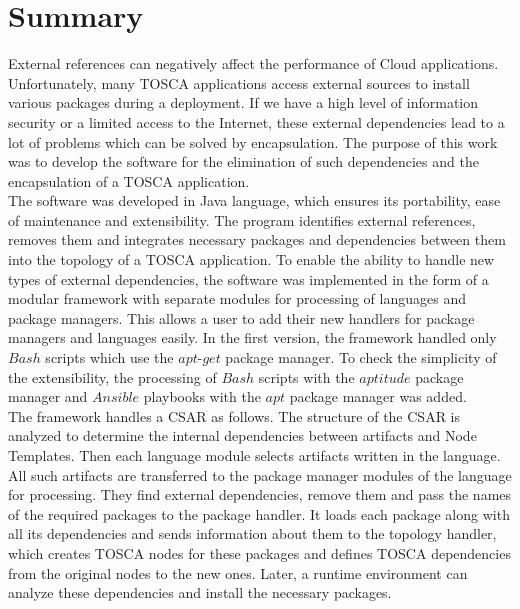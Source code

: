 
\chapter{Summary}\label{chap:zusfas}
External references can negatively affect the performance of Cloud applications.
Unfortunately, many TOSCA applications access external sources to install various packages during a deployment.
If we have a high level of information security or a limited access to the Internet, these external dependencies lead to a lot of problems which can be solved by encapsulation.
The purpose of this work was to develop the software for the elimination of such dependencies and the encapsulation of a TOSCA application.\\
The software was developed in Java language, which ensures its portability, ease of maintenance and extensibility.
The program identifies external references, removes them and integrates necessary packages and dependencies between them into the topology of a TOSCA application.
To enable the ability to handle new types of external dependencies, the software was implemented in the form of a modular framework with separate modules for processing of languages and package managers.
This allows a user to add their new handlers for package managers and languages easily.
In the first version, the framework handled only $Bash$ scripts  which use the $apt$-$get$ package manager.
To check the simplicity of the extensibility, the processing of $Bash$ scripts with the $aptitude$ package manager and  $Ansible$ playbooks with the $apt$ package manager was added.\\
The framework handles a CSAR as follows.
The structure of the CSAR is analyzed to determine the internal dependencies between artifacts and Node Templates.
Then each language module selects artifacts written in the language.
All such artifacts are transferred to the package manager modules of the language for processing.
They find external dependencies, remove them and pass the names of the required packages to the package handler.
It loads each package along with all its dependencies and sends information about them to the topology handler, which creates TOSCA nodes for these packages and defines TOSCA dependencies from the original nodes to the new ones.
Later, a runtime environment can analyze these dependencies and install the necessary packages.\\

